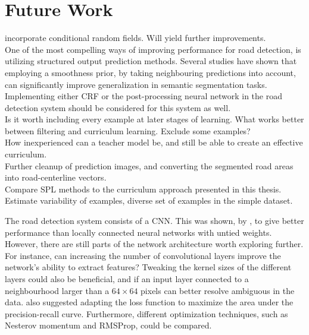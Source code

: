 \section{Future Work}
\label{sec:futureWork}
incorporate conditional random fields. Will yield further improvements.\\
One of the most compelling ways of improving performance for road detection, is utilizing structured output prediction methods. Several studies \citep{Kluckner_semantic_height} \citep{LeCun_semantic} \citep{Mnih_roads_high_res_aerial_images} have shown that employing a smoothness prior, by taking neighbouring predictions into account, can significantly improve generalization in semantic segmentation tasks. Implementing either \ac{CRF} or the post-processing neural network in the road detection system should be considered for this system as well.\\

Is it worth including every example at later stages of learning. What works better between filtering and curriculum learning. Exclude some examples?\\

How inexperienced can a teacher model be, and still be able to create an effective curriculum.\\

Further cleanup of prediction images, and converting the segmented road areas into road-centerline vectors. \\

Compare SPL methods to the curriculum approach presented in this thesis.\\

Estimate variability of examples, diverse set of examples in the simple dataset.\\


The road detection system consists of a \ac{CNN}. This was shown, by \cite{MnihThesis}, to give better performance than locally connected neural networks with untied weights. However, there are still parts of the network architecture worth exploring further. For instance, can increasing the number of convolutional layers improve the network's ability to extract features? Tweaking the kernel sizes of the different layers could also be beneficial, and if an input layer connected to a neighbourhood larger than a $64 \times 64$ pixels can better resolve ambiguous in the data. \cite{MnihThesis} also suggested adapting the loss function to maximize the area under the precision-recall curve. Furthermore, different optimization techniques, such as Nesterov momentum and RMSProp, could be compared.\\



